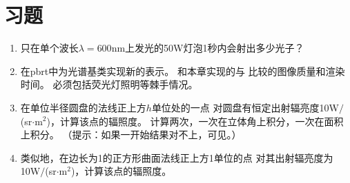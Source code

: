 \section{习题}\label{sec:习题05}
\begin{enumerate}
      \item \circleone 只在单个波长$\lambda=600\text{nm}$上发光的50W灯泡1秒内会射出多少光子？
      \item \circletwo 在pbrt中为光谱基类实现新的表示。
            和本章实现的与
            比较的图像质量和渲染时间。
            必须包括荧光灯照明等棘手情况。
      \item \circleone 在单位半径圆盘的法线正上方$h$单位处的一点
            对圆盘有恒定出射辐亮度10W$/$(sr$\cdot$m$^2$)，计算该点的辐照度。
            计算两次，一次在立体角上积分，一次在面积上积分。
            （提示：如果一开始结果对不上，可见。）
      \item \circleone 类似地，在边长为1的正方形曲面法线正上方1单位的点
            对其出射辐亮度为10W$/$(sr$\cdot$m$^2$)，计算该点的辐照度。
\end{enumerate}